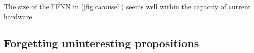 \documentclass[orivec]{llncs}
\newcommand{\vect}[1]{\boldsymbol{#1}}
\begin{document}
The size of the FFNN in (\ref{fig:carousel}) seems well within the capacity of current hardware.

\subsection{Forgetting uninteresting propositions}
\end{document}
